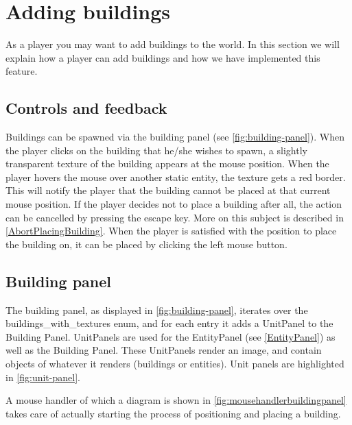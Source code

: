 \section{Adding buildings}
\label{sec:addingbuildings}
As a player you may want to add buildings to the world. In this section we will explain how a player can add buildings and how we have implemented this feature.

\subsection{Controls and feedback}
Buildings can be spawned via the building panel (see \cref{fig:building-panel}). When the player clicks on the building that he/she wishes to spawn, a slightly transparent texture of the building appears at the mouse position. When the player hovers the mouse over another static entity, the texture gets a red border. This will notify the player that the building cannot be placed at that current mouse position. If the player decides not to place a building after all, the action can be cancelled by pressing the escape key. More on this subject is described in \cref{AbortPlacingBuilding}. When the player is satisfied with the position to place the building on, it can be placed by clicking the left mouse button. 

\subsection{Building panel}
The building panel, as displayed in \cref{fig:building-panel}, iterates over the buildings\_with\_textures enum, and for each entry it adds a UnitPanel to the Building Panel. UnitPanels are used for the EntityPanel (see \ref{EntityPanel}) as well as the Building Panel. These UnitPanels render an image, and contain objects of whatever it renders (buildings or entities). Unit panels are highlighted in \cref{fig:unit-panel}.

A mouse handler of which a diagram is shown in \cref{fig:mousehandlerbuildingpanel} takes care of actually starting the process of positioning and placing a building.

